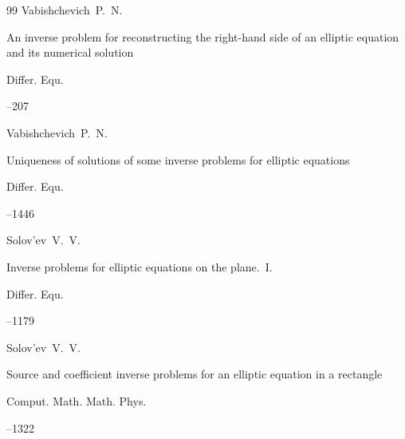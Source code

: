 \begin{thebibliography}{99}
\by Vabishchevich~P.~N.

\paper An inverse problem for reconstructing the right-hand side of an elliptic equation and its numerical solution


\jour Differ. Equ.


--207 






\by Vabishchevich~P.~N.

\paper Uniqueness of solutions of some inverse problems for elliptic equations

\jour Differ. Equ.



--1446 







\by Solov'ev~V.~V. 


\paper Inverse problems for elliptic equations on the plane.~I.

\jour Differ. Equ. 



--1179 







\by Solov'ev~V.~V. 

\paper Source and coefficient inverse problems for an elliptic equation in a rectangle

\jour Comput. Math. Math. Phys.




--1322



\end{thebibliography}
